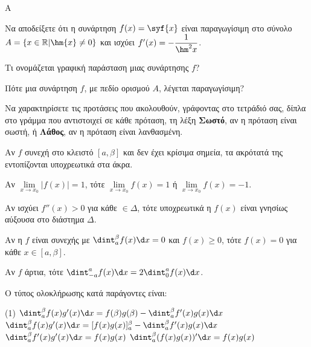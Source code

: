 \begin{thema}{A}
\begin{erwthma}
    \item Να αποδείξετε ότι η συνάρτηση $ f(x)=\syf{x} $ είναι παραγωγίσιμη στο σύνολο $ A=\{x\in\mathbb{R}|\hm{x}\neq 0\} $ και ισχύει $ f'(x)=-\dfrac{1}{\hm^2{x}} $.
    \item Τι ονομάζεται γραφική παράσταση μιας συνάρτησης $f$?
    \item Πότε μια συνάρτηση $f$, με πεδίο ορισμού $A$, λέγεται παραγωγίσιμη?
    \item Να χαρακτηρίσετε τις προτάσεις που ακολουθούν, γράφοντας στο τετράδιό σας, δίπλα στο γράμμα που αντιστοιχεί σε κάθε πρόταση, τη λέξη \textbf{Σωστό}, αν η πρόταση είναι σωστή, ή \textbf{Λάθος}, αν η πρόταση είναι λανθασμένη.
    \begin{alist}
        \item Αν $f$ συνεχή στο κλειστό $[a, \beta]$ και δεν έχει κρίσιμα σημεία, τα ακρότατά της εντοπίζονται υποχρεωτικά στα άκρα.
        \item Αν $\lim\limits_{x\to x_0} |f(x)| = 1$, τότε $\lim\limits_{x\to x_0} f(x) = 1$ ή $\lim\limits_{x\to x_0} f(x) = -1$.
        \item Αν ισχύει $f''(x) > 0$ για κάθε $\in\varDelta$, τότε υποχρεωτικά η $f(x)$ είναι γνησίως αύξουσα στο διάστημα $\varDelta$.
        \item Αν η $f$ είναι συνεχής με $\dint_a^\beta f(x) \d x = 0$ και $f(x) \ge 0$, τότε $f(x) = 0$ για κάθε $x \in [a, \beta]$.
        \item Αν $f$ άρτια, τότε $\dint_{-a}^a f(x) \d x = 2 \dint_0^a f(x) \d x$.
    \end{alist}
    \item Ο τύπος ολοκλήρωσης κατά παράγοντες είναι:
    \begin{tasks}[label=\let\textdexiakeraia\relax\alph*.](1)
        \task $\dint_a^\beta f(x)g'(x) \d x = f(\beta)g(\beta) - \dint_a^\beta f'(x)g(x) \d x$
        \task $\dint_a^\beta f(x)g'(x) \d x = [f(x)g(x)]_a^\beta - \dint_a^\beta f'(x)g(x) \d x$
        \task $\dint_a^\beta f'(x)g'(x) \d x = f(x)g(x)$
        \task $\dint_a^\beta (f(x)g(x))' \d x = f(x) g(x)$
    \end{tasks}
\end{erwthma}
\end{thema}


